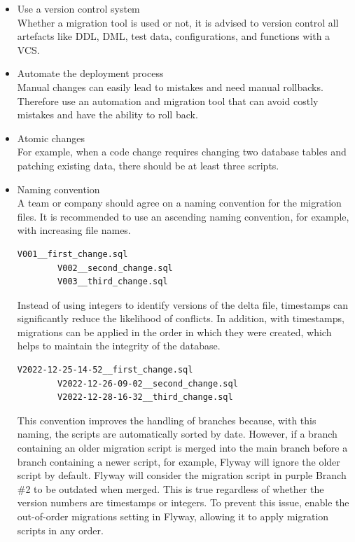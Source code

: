 \begin{itemize}
	\item Use a version control system\\
	Whether a migration tool is used or not, it is advised to version control all artefacts like DDL, DML, test data, configurations, and functions with a \gls{VCS}.
	\item Automate the deployment process\\
	Manual changes can easily lead to mistakes and need manual rollbacks. Therefore use an automation and migration tool that can avoid costly mistakes and have the ability to roll back.
	\item Atomic changes\\
	For example, when a code change requires changing two database tables and patching existing data, there should be at least three scripts.
	\item Naming convention\\
	A team or company should agree on a naming convention for the migration files. It is recommended to use an ascending naming convention, for example, with increasing file names.
	
	\begin{lstlisting}[caption=Increasing file names]
		V001__first_change.sql
		V002__second_change.sql
		V003__third_change.sql
	\end{lstlisting}
	Instead of using integers to identify versions of the delta file, timestamps can significantly reduce the likelihood of conflicts. In addition, with timestamps, migrations can be applied in the order in which they were created, which helps to maintain the integrity of the database. 

	\begin{lstlisting}[caption=Timestamps]
		V2022-12-25-14-52__first_change.sql
		V2022-12-26-09-02__second_change.sql
		V2022-12-28-16-32__third_change.sql
	\end{lstlisting}

	This convention improves the handling of branches because, with this naming, the scripts are automatically sorted by date. However, if a branch containing an older migration script is merged into the main branch before a branch containing a newer script, for example, Flyway will ignore the older script by default. Flyway will consider the migration script in purple Branch \#2 to be outdated when merged. This is true regardless of whether the version numbers are timestamps or integers. To prevent this issue, enable the out-of-order migrations setting in Flyway, allowing it to apply migration scripts in any order.  
	

\end{itemize}

